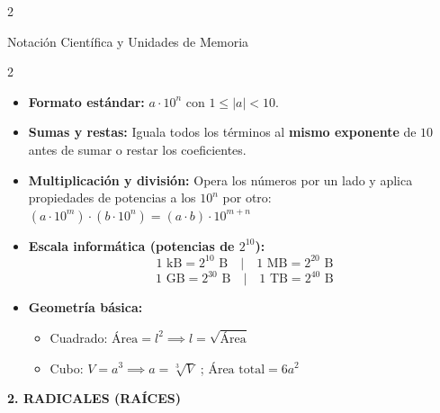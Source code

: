 \documentclass[a4paper,11pt]{article}
\begin{document}
\begin{multicols}{2}
\end{multicols}

\begin{formulabox}{Notación Científica y Unidades de Memoria}
\begin{multicols}{2}
\begin{itemize}[leftmargin=*, itemsep=2pt, topsep=0pt]
    \item \textbf{Formato estándar:} $a \cdot 10^{n}$ con $1 \leq |a| < 10$.
    \item \textbf{Sumas y restas:} Iguala todos los términos al \textbf{mismo exponente} de $10$ antes de sumar o restar los coeficientes.
    \item \textbf{Multiplicación y división:} Opera los números por un lado y aplica propiedades de potencias a los $10^{n}$ por otro:
    $(a \cdot 10^{m}) \cdot (b \cdot 10^{n}) = (a \cdot b) \cdot 10^{m+n}$
\end{itemize}
\columnbreak
\begin{itemize}[leftmargin=*, itemsep=2pt, topsep=0pt]
    \item \textbf{Escala informática (potencias de $2^{10}$):}
    $$1\text{ kB} = 2^{10}\text{ B} \quad \big|\quad 1\text{ MB} = 2^{20}\text{ B}$$
    $$1\text{ GB} = 2^{30}\text{ B} \quad \big|\quad 1\text{ TB} = 2^{40}\text{ B}$$
    \item \textbf{Geometría básica:}
    \begin{itemize}[leftmargin=12pt]
        \item Cuadrado: $\text{Área} = l^{2} \implies l = \sqrt{\text{Área}}$
        \item Cubo: $V = a^{3} \implies a = \sqrt[3]{V}$ ; $\text{Área total} = 6a^{2}$
    \end{itemize}
\end{itemize}
\end{multicols}
\end{formulabox}

\vspace{0.2cm}
\noindent\textbf{\large\color{primary} 2. RADICALES (RAÍCES)}
\vspace{0.1cm}
\end{document}
